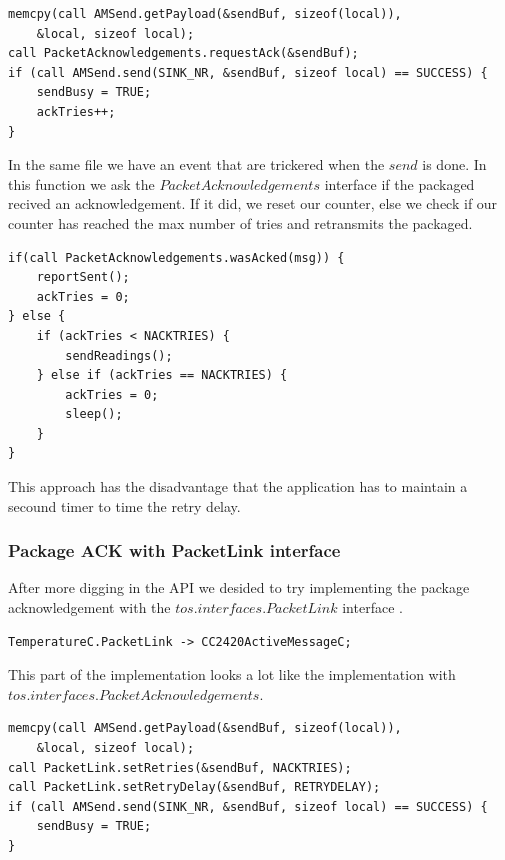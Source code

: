 \begin{lstlisting}[caption={TemperatureC.nc $\rightarrow$ sendReadings()}]
memcpy(call AMSend.getPayload(&sendBuf, sizeof(local)),
    &local, sizeof local);
call PacketAcknowledgements.requestAck(&sendBuf);
if (call AMSend.send(SINK_NR, &sendBuf, sizeof local) == SUCCESS) {
    sendBusy = TRUE;
    ackTries++;
}
\end{lstlisting}

In the same file we have an event that are trickered when the $send$ is done.
In this function we ask the $PacketAcknowledgements$ interface if the packaged
recived an acknowledgement. If it did, we reset our counter, else we check if
our counter has reached the max number of tries and retransmits the packaged.

\begin{lstlisting}[caption={TemperatureC.nc $\rightarrow$ AMSend.sendDone()}]
if(call PacketAcknowledgements.wasAcked(msg)) {
    reportSent();
    ackTries = 0;
} else {
    if (ackTries < NACKTRIES) {
        sendReadings();
    } else if (ackTries == NACKTRIES) {
        ackTries = 0;
        sleep();
    }
}
\end{lstlisting}

This approach has the disadvantage that the application has to maintain a
secound timer to time the retry delay.

\subsubsection{Package ACK with PacketLink interface}

After more digging in the API we desided to try implementing the package
acknowledgement with the $tos.interfaces.PacketLink$ interface \cite{telosbAPI}.

\begin{lstlisting}[caption={TemperatureAppC.nc}]
TemperatureC.PacketLink -> CC2420ActiveMessageC;
\end{lstlisting}

This part of the implementation looks a lot like the implementation with
$tos.interfaces.PacketAcknowledgements$.

\begin{lstlisting}[caption={TemperatureC.nc $\rightarrow$ sendReadings()}]
memcpy(call AMSend.getPayload(&sendBuf, sizeof(local)),
    &local, sizeof local);
call PacketLink.setRetries(&sendBuf, NACKTRIES);
call PacketLink.setRetryDelay(&sendBuf, RETRYDELAY);
if (call AMSend.send(SINK_NR, &sendBuf, sizeof local) == SUCCESS) {
    sendBusy = TRUE;
}
\end{lstlisting}

